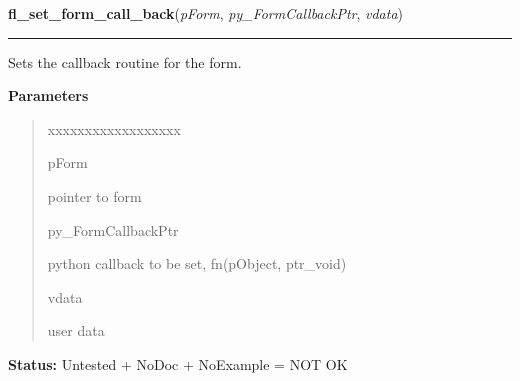 \hspace{.8\funcindent}\begin{boxedminipage}{\funcwidth}

    \raggedright \textbf{fl\_set\_form\_call\_back}(\textit{pForm}, \textit{py\_FormCallbackPtr}, \textit{vdata})

    \vspace{-1.5ex}

    \rule{\textwidth}{0.5\fboxrule}
\setlength{\parskip}{2ex}
    Sets the callback routine for the form.

\setlength{\parskip}{1ex}
      \textbf{Parameters}
      \vspace{-1ex}

      \begin{quote}
        \begin{Ventry}{xxxxxxxxxxxxxxxxxx}

          \item[pForm]

          pointer to form

          \item[py\_FormCallbackPtr]

          python callback to be set, fn(pObject, ptr\_void)

          \item[vdata]

          user data

        \end{Ventry}

      \end{quote}

\textbf{Status:} Untested + NoDoc + NoExample = NOT OK



    \end{boxedminipage}

    \label{xformslib:library:fl_set_form_size}

    \vspace{0.5ex}

